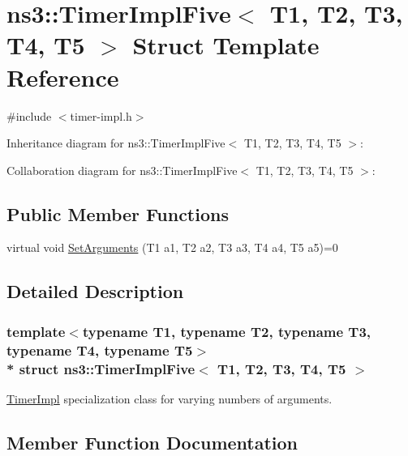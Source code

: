 \hypertarget{structns3_1_1TimerImplFive}{}\section{ns3\+:\+:Timer\+Impl\+Five$<$ T1, T2, T3, T4, T5 $>$ Struct Template Reference}
\label{structns3_1_1TimerImplFive}


{\ttfamily \#include $<$timer-\/impl.\+h$>$}



Inheritance diagram for ns3\+:\+:Timer\+Impl\+Five$<$ T1, T2, T3, T4, T5 $>$\+:


Collaboration diagram for ns3\+:\+:Timer\+Impl\+Five$<$ T1, T2, T3, T4, T5 $>$\+:
\subsection*{Public Member Functions}
\begin{DoxyCompactItemize}
\item 
virtual void \hyperlink{structns3_1_1TimerImplFive_ad17ecef158dcd6aa6402652602cef5db}{Set\+Arguments} (T1 a1, T2 a2, T3 a3, T4 a4, T5 a5)=0
\end{DoxyCompactItemize}


\subsection{Detailed Description}
\subsubsection*{template$<$typename T1, typename T2, typename T3, typename T4, typename T5$>$\\*
struct ns3\+::\+Timer\+Impl\+Five$<$ T1, T2, T3, T4, T5 $>$}

\hyperlink{classns3_1_1TimerImpl}{Timer\+Impl} specialization class for varying numbers of arguments. 

\subsection{Member Function Documentation}

